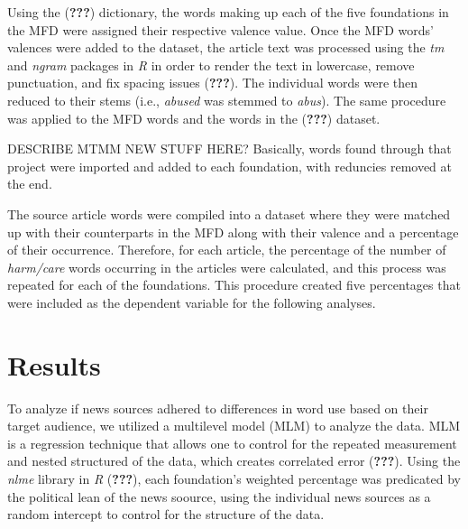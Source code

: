 \documentclass[,man]{apa6}
\theoremstyle{definition}
\theoremstyle{definition}
\theoremstyle{definition}
\theoremstyle{remark}
\begin{document}
Using the ({\textbf{???}}) dictionary, the words making up each of the
five foundations in the MFD were assigned their respective valence
value. Once the MFD words' valences were added to the dataset, the
article text was processed using the \emph{tm} and \emph{ngram} packages
in \emph{R} in order to render the text in lowercase, remove
punctuation, and fix spacing issues ({\textbf{???}}). The individual
words were then reduced to their stems (i.e., \emph{abused} was stemmed
to \emph{abus}). The same procedure was applied to the MFD words and the
words in the ({\textbf{???}}) dataset.

DESCRIBE MTMM NEW STUFF HERE? Basically, words found through that
project were imported and added to each foundation, with reduncies
removed at the end.

The source article words were compiled into a dataset where they were
matched up with their counterparts in the MFD along with their valence
and a percentage of their occurrence. Therefore, for each article, the
percentage of the number of \emph{harm/care} words occurring in the
articles were calculated, and this process was repeated for each of the
foundations. This procedure created five percentages that were included
as the dependent variable for the following analyses.

\hypertarget{results}{%
\section{Results}\label{results}}

To analyze if news sources adhered to differences in word use based on
their target audience, we utilized a multilevel model (MLM) to analyze
the data. MLM is a regression technique that allows one to control for
the repeated measurement and nested structured of the data, which
creates correlated error ({\textbf{???}}). Using the \emph{nlme} library
in \emph{R} ({\textbf{???}}), each foundation's weighted percentage was
predicated by the political lean of the news soource, using the
individual news sources as a random intercept to control for the
structure of the data.
\end{document}
